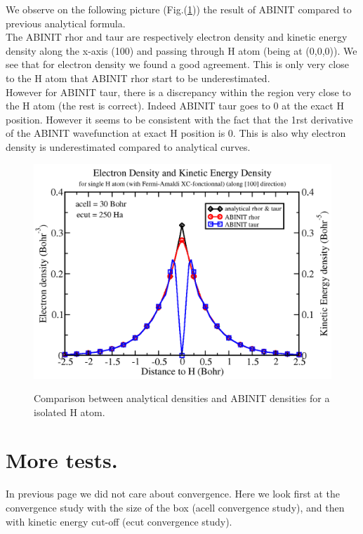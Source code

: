 \documentclass[a4paper,12pt]{report}
\begin{document}
We observe on the following picture (Fig.(\ref{fig1})) the result of ABINIT compared to previous analytical formula.\\
The ABINIT rhor and taur are respectively electron density and kinetic energy density along the x-axis (100) and passing through H atom (being at (0,0,0)).
We see that for electron density we found a good agreement. This is only very close to the H atom that ABINIT rhor start to be underestimated.\\
However for ABINIT taur, there is a discrepancy within the region very close to the H atom (the rest is correct). Indeed ABINIT taur goes to 0 at the exact H position.
However it seems  to be consistent with the fact that the 1rst derivative of the ABINIT wavefunction at exact H position is 0. This is also why electron density is underestimated compared to analytical curves.

\begin{figure}[!h]
\centering
\begin{minipage}[c]{1.0\textwidth}
\includegraphics[width = \textwidth]{fig1}
\end{minipage}
\vspace{0.12\textwidth}
\begin{minipage}[c]{0.8\textwidth}
\caption{\small Comparison between analytical densities and ABINIT densities for a isolated H atom.}
\vspace*{1.0ex}
\label{fig1}
\end{minipage}
\end{figure}

\section{More tests.}
\label{section2}
In previous page we did not care about convergence. Here we look first at the convergence study with the size of the box (acell convergence study), and then with kinetic energy cut-off (ecut convergence study).
\end{document}
